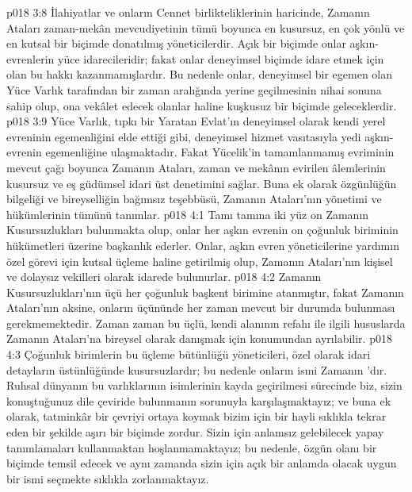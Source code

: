 \vs p018 3:8 İlahiyatlar ve onların Cennet birlikteliklerinin haricinde, Zamanın Ataları zaman\hyp{}mekân mevcudiyetinin tümü boyunca en kusursuz, en çok yönlü ve en kutsal bir biçimde donatılmış yöneticilerdir. Açık bir biçimde onlar aşkın\hyp{}evrenlerin yüce idarecileridir; fakat onlar deneyimsel biçimde idare etmek için olan bu hakkı kazanmamışlardır. Bu nedenle onlar, deneyimsel bir egemen olan Yüce Varlık tarafından bir zaman aralığında yerine geçilmesinin nihai sonuna sahip olup, ona vekâlet edecek olanlar haline kuşkusuz bir biçimde geleceklerdir.
\vs p018 3:9 Yüce Varlık, tıpkı bir Yaratan Evlat’ın deneyimsel olarak kendi yerel evreninin egemenliğini elde ettiği gibi, deneyimsel hizmet vasıtasıyla yedi aşkın\hyp{}evrenin egemenliğine ulaşmaktadır. Fakat Yücelik’in tamamlanmamış evriminin mevcut çağı boyunca Zamanın Ataları, zaman ve mekânın evirilen âlemlerinin kusursuz ve eş güdümsel idari üst denetimini sağlar. Buna ek olarak özgünlüğün bilgeliği ve bireyselliğin bağımsız teşebbüsü, Zamanın Ataları’nın yönetimi ve hükümlerinin tümünü tanımlar.
\vs p018 4:1 Tamı tamına iki yüz on Zamanın Kusursuzlukları bulunmakta olup, onlar her aşkın evrenin on çoğunluk biriminin hükümetleri üzerine başkanlık ederler. Onlar, aşkın evren yöneticilerine yardımın özel görevi için kutsal üçleme haline getirilmiş olup, Zamanın Ataları’nın kişisel ve dolaysız vekilleri olarak idarede bulunurlar.
\vs p018 4:2 Zamanın Kusursuzlukları’nın üçü her çoğunluk başkent birimine atanmıştır, fakat Zamanın Ataları’nın aksine, onların üçününde her zaman mevcut bir durumda bulunması gerekmemektedir. Zaman zaman bu üçlü, kendi alanının refahı ile ilgili hususlarda Zamanın Ataları’na bireysel olarak danışmak için konumundan ayrılabilir.
\vs p018 4:3 Çoğunluk birimlerin bu üçleme bütünlüğü yöneticileri, özel olarak idari detayların üstünlüğünde kusursuzlardır; bu nedenle onların ismi Zamanın ’dır. Ruhsal dünyanın bu varlıklarının isimlerinin kayda geçirilmesi sürecinde biz, sizin konuştuğunuz dile çeviride bulunmanın sorunuyla karşılaşmaktayız; ve buna ek olarak, tatminkâr bir çevriyi ortaya koymak bizim için bir hayli sıklıkla tekrar eden bir şekilde aşırı bir biçimde zordur. Sizin için anlamsız gelebilecek yapay tanımlamaları kullanmaktan hoşlanmamaktayız; bu nedenle, özgün olanı bir biçimde temsil edecek ve aynı zamanda sizin için açık bir anlamda olacak uygun bir ismi seçmekte sıklıkla zorlanmaktayız.

